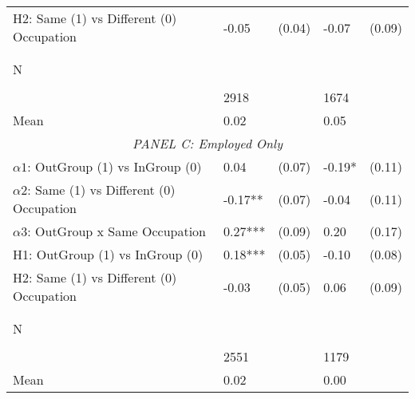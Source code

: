 \begin{tabular}{l*{4}{l}}
H2: Same (1) vs Different (0) Occupation&    -0.05   &   (0.04)&    -0.07   &   (0.09)\\
 
\\\\[-0.5cm] N \\\\[-0.6cm]&     2918   &         &     1674   &         \\
Mean            &     0.02&         &     0.05&         \\
 
 \multicolumn{5}{c}{\textit{PANEL C: Employed Only}} \\  \midrule 
$\alpha1$: OutGroup (1) vs InGroup (0)&        0.04   &      (0.07)&       -0.19*  &      (0.11)\\
$\alpha2$: Same (1) vs Different (0) Occupation&       -0.17** &      (0.07)&       -0.04   &      (0.11)\\
 
$\alpha3$: OutGroup x Same Occupation&     0.27***&   (0.09)&     0.20   &   (0.17)\\
 
H1: OutGroup (1) vs InGroup (0)&     0.18***&   (0.05)&    -0.10   &   (0.08)\\
 
H2: Same (1) vs Different (0) Occupation&    -0.03   &   (0.05)&     0.06   &   (0.09)\\
 
\\\\[-0.5cm] N \\\\[-0.6cm]&     2551   &         &     1179   &         \\
Mean            &     0.02&         &     0.00&         \\
 
\bottomrule  \end{tabular}  
